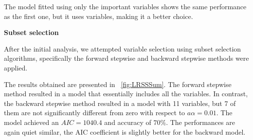The model fitted using only the important variables shows the same performance as the first one, but it uses variables, making it a better choice.

\vspace{0.2cm}
\textbf{Subset selection}

After the initial analysis, we attempted variable selection using subset selection algorithms, specifically the forward stepwise and backward stepwise methods were applied. 

The results obtained are presented in \Fig~\ref{fig:LRSSSum}. The forward stepwise method resulted in a model that essentially includes all the variables. In contrast, the backward stepwise method resulted in a model with 11 variables, but 7 of them are not significantly different from zero with respect to $a\alpha = 0.01$. The model achieved an $AIC = 1040.4$ and accuracy of $70\%$. The performances are again quiet similar, the AIC coefficient is slightly better for the backward model.

